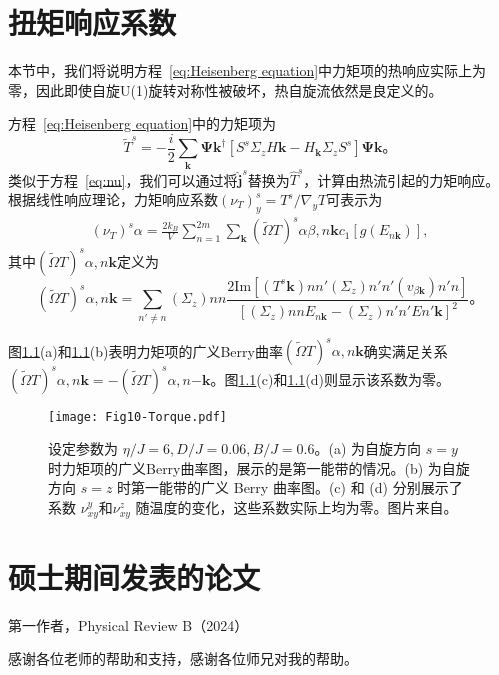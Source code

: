 \documentclass[type=master]{fduthesis}
\newcommand{\bm}[1]{\symbf{#1}}
\begin{document}

\mainmatter

%   
%   
%   







\appendix

\chapter{扭矩响应系数}
本节中，我们将说明方程~\eqref{eq:Heisenberg equation}中力矩项的热响应实际上为零，因此即使自旋U(1)旋转对称性被破坏，热自旋流依然是良定义的。

方程~\eqref{eq:Heisenberg equation}中的力矩项为
\begin{equation}
    \tilde{T}^s=-\frac{i}{2}\sum_{\bm{k}}\bm{\Psi}{\bm{k}}^\dagger\left[S^s\Sigma_z H{\bm{k}}-H_{\bm{k}}\Sigma_z S^s\right]\bm{\Psi}{\bm{k}}。
\end{equation}
类似于方程~\eqref{eq:nu}，我们可以通过将$\hat{\bm{j}}^s$替换为$\hat{T}^s$，计算由热流引起的力矩响应。根据线性响应理论，力矩响应系数$(\nu_T)^s_y=T^s/\nabla_y T$可表示为
\begin{align}
    (\nu_T)^s{\alpha}=\frac{2k_B}{V}\sum_{n=1}^{2m}\sum_{{\bm{k}}}(\tilde{\Omega}T)^s{\alpha\beta,n{\bm{k}}}c_1[g(E_{n{\bm{k}}})],
    \label{eq:nu_T}
\end{align}
其中$(\tilde{\Omega}T)^s{\alpha,n{\bm{k}}}$定义为
    \begin{equation}
    (\tilde{\Omega}T)^s{\alpha,n{\bm{k}}}=\sum_{n'\neq n}(\Sigma_z){nn}\frac{2\text{Im}[(T^s{{\bm{k}}}){nn'}(\Sigma_z){n'n'}(v_{\beta{\bm{k}}}){n'n}]}{\left[(\Sigma_z){nn}E_{n{\bm{k}}}-(\Sigma_z){n'n'}E{n'{\bm{k}}}\right]^2}。
    \label{GsBC_T}
\end{equation}

图\ref{fig:Torque}(a)和\ref{fig:Torque}(b)表明力矩项的广义Berry曲率$(\tilde{\Omega}T)^s{\alpha,n{\bm{k}}}$确实满足关系$(\tilde{\Omega}T)^s{\alpha,n{\bm{k}}}=-(\tilde{\Omega}T)^s{\alpha,n\bm{-k}}$。图\ref{fig:Torque}(c)和\ref{fig:Torque}(d)则显示该系数为零。

\begin{figure}[!h]
    \centering
    \texttt{[image: Fig10-Torque.pdf]}
    \caption{设定参数为 $\eta/J=6, D/J=0.06, B/J=0.6$。(a) 为自旋方向 $s=y$ 时力矩项的广义Berry曲率图，展示的是第一能带的情况。(b) 为自旋方向 $s=z$ 时第一能带的广义 Berry 曲率图。(c) 和 (d) 分别展示了系数 $\nu^y_{xy}$和$\nu^z_{xy}$ 随温度的变化，这些系数实际上均为零。图片来自\cite{lu2024Spin}。}
    \label{fig:Torque}
\end{figure}

\backmatter

\printbibliography

\chapter{硕士期间发表的论文}
第一作者，Physical Review B（2024）

\begin{acknowledgements}
  感谢各位老师的帮助和支持，感谢各位师兄对我的帮助。
\end{acknowledgements}
\end{document}

